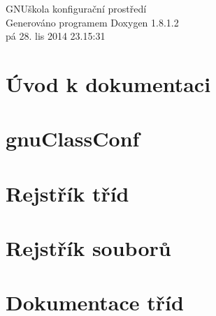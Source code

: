\documentclass{book}
\begin{document}
\hypersetup{pageanchor=false,citecolor=blue}
\begin{titlepage}
\vspace*{7cm}
\begin{center}
{\Large G\-N\-Uškola konfigurační prostředí }\\
\vspace*{1cm}
{\large Generováno programem Doxygen 1.8.1.2}\\
\vspace*{0.5cm}
{\small pá 28. lis 2014 23.15:31}\\
\end{center}
\end{titlepage}
\clearemptydoublepage
{}
\tableofcontents
\clearemptydoublepage
{}
\hypersetup{pageanchor=true,citecolor=blue}
\chapter{Úvod k dokumentaci}
\label{index}\hypertarget{index}{}
\chapter{gnu\-Class\-Conf}
\label{md_README}
\hypertarget{md_README}{}

\chapter{Rejstřík tříd}

\chapter{Rejstřík souborů}

\chapter{Dokumentace tříd}



































\end{document}
